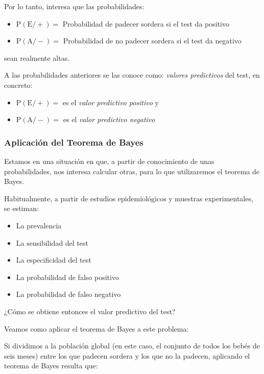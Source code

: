 \documentclass[
]{article}
\begin{document}
Por lo tanto, interesa que las probabilidades:

\begin{itemize}
\item
  \(\mathrm{P}(\mathrm{E} /+)=\) Probabilidad de padecer sordera si el test da positivo
\item
  \(\mathrm{P}(\mathrm{A} /-)=\) Probabilidad de no padecer sordera si el test da negativo
\end{itemize}

sean realmente altas.

A las probabilidades
anteriores se las conoce como: \emph{valores predictivos} del test, en concreto:

\begin{itemize}
\item
  \(\mathrm{P}(\mathrm{E} /+)=\) es el \emph{valor predictivo positivo} y
\item
  \(\mathrm{P}(\mathrm{A} /-)=\) es el \emph{valor predictivo negativo}
\end{itemize}

\subsubsection{Aplicación del Teorema de Bayes}\label{aplicaciuxf3n-del-teorema-de-bayes}

Estamos en una situación en que, a partir de conocimiento de unas probabilidades, nos interesa calcular otras, para lo que utilizaremos el teorema de Bayes.

Habitualmente, a partir de estudios epidemiológicos y muestras experimentales, se estiman:

\begin{itemize}
\item
  La prevalencia
\item
  La sensibilidad del test
\item
  La especificidad del test
\item
  La probabilidad de falso positivo
\item
  La probabilidad de falso negativo
\end{itemize}

¿Cómo se obtiene entonces el valor predictivo del test?

Veamos como aplicar el teorema de Bayes a este problema:

Si dividimos a la población global (en este caso, el conjunto de todos los bebés de seis meses) entre los que padecen sordera y los que no la padecen, aplicando el teorema de Bayes resulta que:
\end{document}
